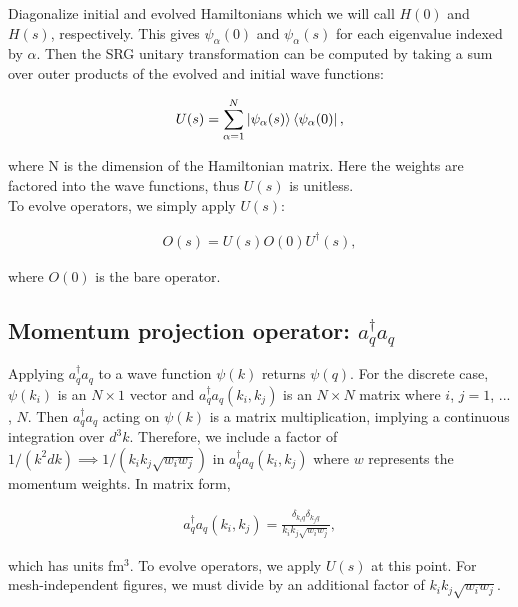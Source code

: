 \documentclass[preprintnumbers,floatfix,aps,prc,preprint,nofootinbib]{revtex4-1}
\begin{document}
Diagonalize initial and evolved Hamiltonians which we will call $H(0)$ and $H(s)$, respectively. This gives $\psi_{\alpha}(0)$ and $\psi_{\alpha}(s)$ for each eigenvalue indexed by $\alpha$. Then the SRG unitary transformation can be computed by taking a sum over outer products of the evolved and initial wave functions:

\begin{eqnarray}
	\label{eq:unitary_transformation}
	U(s) = \sum_{\alpha=1}^{N} \ket{\psi_{\alpha}(s)} \bra{\psi_{\alpha}(0)},
\end{eqnarray}

where N is the dimension of the Hamiltonian matrix. Here the weights are factored into the wave functions, thus $U(s)$ is unitless.
\\

To evolve operators, we simply apply $U(s)$:

\begin{eqnarray}
	\label{eq:evolved_operator}
	O(s) = U(s) O(0) U^{\dagger}(s),
\end{eqnarray}

where $O(0)$ is the bare operator.


\subsection{Momentum projection operator: $a^{\dagger}_q a_q$}
\label{sec:momentum_proj_operator}


Applying $a^{\dagger}_q a_q$ to a wave function $\psi(k)$ returns $\psi(q)$. For the discrete case, $\psi(k_i)$ is an $N \times 1$ vector and $a^{\dagger}_q a_q (k_i, k_j)$ is an $N \times N$ matrix where $i$, $j=1$, ... , $N$. Then $a^{\dagger}_q a_q$ acting on $\psi(k)$ is a matrix multiplication, implying a continuous integration over $d^3k$. Therefore, we include a factor of $1 / (k^2 dk) \implies 1 / (k_i k_j \sqrt{w_i w_j})$ in $a^{\dagger}_q a_q (k_i, k_j)$ where $w$ represents the momentum weights. In matrix form,

\begin{eqnarray}
	\label{eq:momentum_projection_operator}
	a^{\dagger}_q a_q (k_i, k_j) = \frac{\delta_{k_i q} \delta_{k_j q}}{k_i k_j \sqrt{w_i w_j}},
\end{eqnarray}

which has units fm$^3$. To evolve operators, we apply $U(s)$ at this point. For mesh-independent figures, we must divide by an additional factor of $k_i k_j \sqrt{w_i w_j}$.
\end{document}
